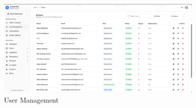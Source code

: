 \begin{figure}[H]
\centering
\includegraphics[width=0.9\textwidth]{images/screenshots/user_management.png}
\caption{User Management}
\label{fig:ss-users}
\end{figure}

